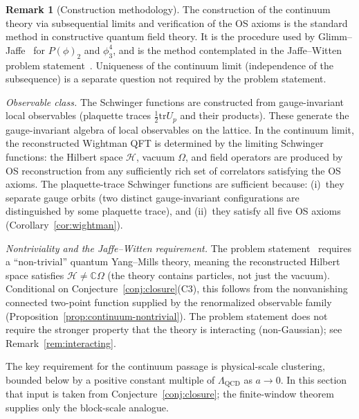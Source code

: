 \documentclass[11pt]{article}
\theoremstyle{definition}
\newtheorem{remark}[theorem]{Remark}
\newcommand{\tr}{\mathrm{tr}}
\newcommand{\Lam}{\Lambda_{\mathrm{QCD}}}
\begin{document}
\begin{remark}[Construction methodology]%
\label{rem:methodology}
The construction of the continuum theory via subsequential limits
and verification of the OS axioms is the standard method in
constructive quantum field theory.  It is the procedure used by
Glimm--Jaffe~\cite{GlimmJaffe} for $P(\phi)_2$ and $\phi^4_3$,
and is the method contemplated in the Jaffe--Witten problem
statement~\cite{JaffeWitten}.  Uniqueness of the continuum limit
(independence of the subsequence) is a separate question not
required by the problem statement.

\emph{Observable class.}
The Schwinger functions are constructed from gauge-invariant
local observables (plaquette traces $\frac{1}{2}\tr U_p$
and their products).  These generate the gauge-invariant
algebra of local observables on the lattice.
In the continuum limit, the reconstructed Wightman QFT
is determined by the limiting Schwinger functions:
the Hilbert space $\mathcal{H}$, vacuum $\Omega$, and
field operators are produced by OS reconstruction
from any sufficiently rich set of correlators satisfying
the OS axioms.  The plaquette-trace Schwinger functions are
sufficient because: (i)~they separate gauge orbits
(two distinct gauge-invariant configurations are distinguished
by some plaquette trace), and (ii)~they satisfy all five OS axioms
(Corollary~\ref{cor:wightman}).

\emph{Nontriviality and the Jaffe--Witten requirement.}
The problem statement~\cite{JaffeWitten} requires a ``non-trivial''
quantum Yang--Mills theory, meaning the reconstructed Hilbert
space satisfies $\mathcal{H}\neq\mathbb{C}\Omega$
(the theory contains particles, not just the vacuum).
Conditional on Conjecture~\ref{conj:closure}(C3), this follows from the
nonvanishing connected two-point function supplied by the renormalized
observable family (Proposition~\ref{prop:continuum-nontrivial}).  The
problem statement does not require the stronger property that the theory
is interacting (non-Gaussian); see Remark~\ref{rem:interacting}.
\end{remark}

The key requirement for the continuum passage is physical-scale
clustering, bounded below by a positive constant multiple of $\Lam$ as
$a\to0$.  In this section that input is taken from
Conjecture~\ref{conj:closure}; the finite-window theorem supplies only
the block-scale analogue.
\end{document}
